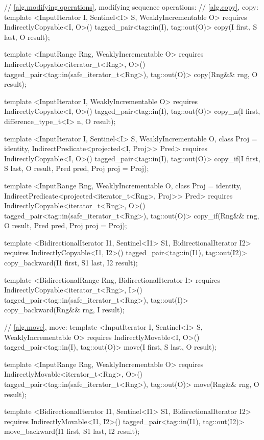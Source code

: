 \begin{codeblock}
{{{{  // \ref{alg.modifying.operations}, modifying sequence operations:
  // \ref{alg.copy}, copy:
  template <InputIterator I, Sentinel<I> S, WeaklyIncrementable O>
    requires IndirectlyCopyable<I, O>()
    tagged_pair<tag::in(I), tag::out(O)>
      copy(I first, S last, O result);

  template <InputRange Rng, WeaklyIncrementable O>
    requires IndirectlyCopyable<iterator_t<Rng>, O>()
    tagged_pair<tag::in(safe_iterator_t<Rng>), tag::out(O)>
      copy(Rng&& rng, O result);

  template <InputIterator I, WeaklyIncrementable O>
    requires IndirectlyCopyable<I, O>()
    tagged_pair<tag::in(I), tag::out(O)>
      copy_n(I first, difference_type_t<I> n, O result);

  template <InputIterator I, Sentinel<I> S, WeaklyIncrementable O, class Proj = identity,
      IndirectPredicate<projected<I, Proj>> Pred>
    requires IndirectlyCopyable<I, O>()
    tagged_pair<tag::in(I), tag::out(O)>
      copy_if(I first, S last, O result, Pred pred, Proj proj = Proj{});

  template <InputRange Rng, WeaklyIncrementable O, class Proj = identity,
      IndirectPredicate<projected<iterator_t<Rng>, Proj>> Pred>
    requires IndirectlyCopyable<iterator_t<Rng>, O>()
    tagged_pair<tag::in(safe_iterator_t<Rng>), tag::out(O)>
      copy_if(Rng&& rng, O result, Pred pred, Proj proj = Proj{});

  template <BidirectionalIterator I1, Sentinel<I1> S1, BidirectionalIterator I2>
    requires IndirectlyCopyable<I1, I2>()
    tagged_pair<tag::in(I1), tag::out(I2)>
      copy_backward(I1 first, S1 last, I2 result);

  template <BidirectionalRange Rng, BidirectionalIterator I>
    requires IndirectlyCopyable<iterator_t<Rng>, I>()
    tagged_pair<tag::in(safe_iterator_t<Rng>), tag::out(I)>
      copy_backward(Rng&& rng, I result);

  // \ref{alg.move}, move:
  template <InputIterator I, Sentinel<I> S, WeaklyIncrementable O>
    requires IndirectlyMovable<I, O>()
    tagged_pair<tag::in(I), tag::out(O)>
      move(I first, S last, O result);

  template <InputRange Rng, WeaklyIncrementable O>
    requires IndirectlyMovable<iterator_t<Rng>, O>()
    tagged_pair<tag::in(safe_iterator_t<Rng>), tag::out(O)>
      move(Rng&& rng, O result);

  template <BidirectionalIterator I1, Sentinel<I1> S1, BidirectionalIterator I2>
    requires IndirectlyMovable<I1, I2>()
    tagged_pair<tag::in(I1), tag::out(I2)>
      move_backward(I1 first, S1 last, I2 result);

}}}}
\end{codeblock}
